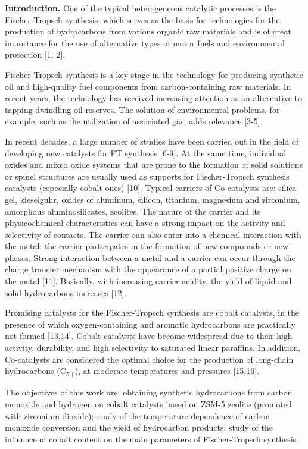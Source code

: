 \textbf{Introduction.} One of the typical heterogeneous catalytic
processes is the Fischer-Tropsch synthesis, which serves as the basis
for technologies for the production of hydrocarbons from various organic
raw materials and is of great importance for the use of alternative
types of motor fuels and environmental protection {[}1, 2{]}.

Fischer-Tropsch synthesis is a key stage in the technology for producing
synthetic oil and high-quality fuel components from carbon-containing
raw materials. In recent years, the technology has received increasing
attention as an alternative to tapping dwindling oil reserves. The
solution of environmental problems, for example, such as the utilization
of associated gas, adds relevance {[}3-5{]}.

In recent decades, a large number of studies have been carried out in
the field of developing new catalysts for FT synthesis {[}6-9{]}. At the
same time, individual oxides and mixed oxide systems that are prone to
the formation of solid solutions or spinel structures are usually used
as supports for Fischer-Tropsch synthesis catalysts (especially cobalt
ones) {[}10{]}. Typical carriers of Co-catalysts are: silica gel,
kieselguhr, oxides of aluminum, silicon, titanium, magnesium and
zirconium, amorphous aluminosilicates, zeolites. The nature of the
carrier and its physicochemical characteristics can have a strong impact
on the activity and selectivity of contacts. The carrier can also enter
into a chemical interaction with the metal; the carrier participates in
the formation of new compounds or new phases. Strong interaction between
a metal and a carrier can occur through the charge transfer mechanism
with the appearance of a partial positive charge on the metal {[}11{]}.
Basically, with increasing carrier acidity, the yield of liquid and
solid hydrocarbons increases {[}12{]}.

Promising catalysts for the Fischer-Tropsch synthesis are cobalt
catalysts, in the presence of which oxygen-containing and aromatic
hydrocarbons are practically not formed {[}13,14{]}. Cobalt catalysts
have become widespread due to their high activity, durability, and high
selectivity to saturated linear paraffins. In addition, Co-catalysts are
considered the optimal choice for the production of long-chain
hydrocarbons (C\textsubscript{5+}), at moderate temperatures and
pressures {[}15,16{]}.

The objectives of this work are: obtaining synthetic hydrocarbons from
carbon monoxide and hydrogen on cobalt catalysts based on ZSM-5 zeolite
(promoted with zirconium dioxide); study of the temperature dependence
of carbon monoxide conversion and the yield of hydrocarbon products;
study of the influence of cobalt content on the main parameters of
Fischer-Tropsch synthesis.

